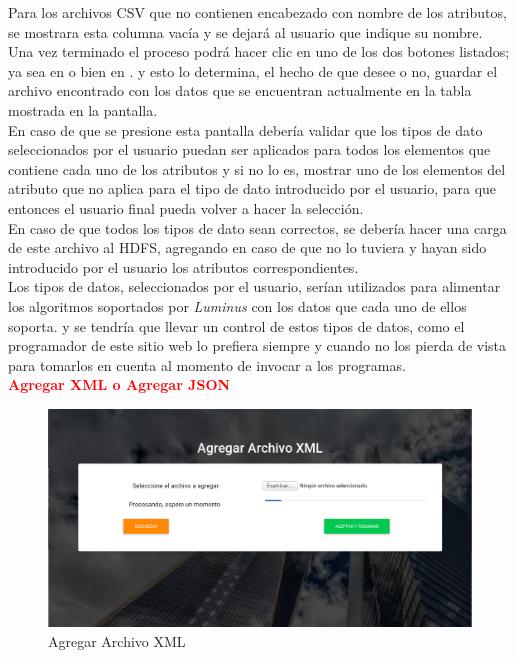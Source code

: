 Para los archivos CSV que no contienen encabezado con nombre de los atributos, se mostrara esta columna vacía y se dejará al usuario que indique su nombre.\\
Una vez terminado el proceso podrá hacer clic en uno de los dos botones listados; ya sea en  o bien en . y esto lo determina, el hecho de que desee o no, guardar el archivo encontrado con los datos que se encuentran actualmente en la tabla mostrada en la pantalla.\\
En caso de que se presione  esta pantalla debería validar que los tipos de dato seleccionados por el usuario puedan ser aplicados para todos los elementos que contiene cada uno de los atributos y si no lo es, mostrar uno de los elementos del atributo que no aplica para el tipo de dato introducido por el usuario, para que entonces el usuario final pueda volver a hacer la selección.\\
En caso de que todos los tipos de dato sean correctos, se debería hacer una carga de este archivo al HDFS, agregando en caso de que no lo tuviera y hayan sido introducido por el usuario los atributos correspondientes.\\
Los tipos de datos, seleccionados por el usuario, serían utilizados para alimentar los algoritmos soportados por \emph{Luminus} con los datos que cada uno de ellos soporta. y se tendría que llevar un control de estos tipos de datos, como el programador de este sitio web lo prefiera siempre y cuando no los pierda de vista para tomarlos en cuenta al momento de invocar a los programas.\\
\textbf{\textcolor{red}{Agregar XML o Agregar JSON}}
\begin{figure}[H]
	\hypertarget{fig:red}{\hspace{1pt}}
	\begin{center}
		\includegraphics[width=.9\textwidth]{capitulo7/images/agregarXML.png}
		\caption{Agregar Archivo XML}
		\label{fig:XML}
	\end{center}
\end{figure}
